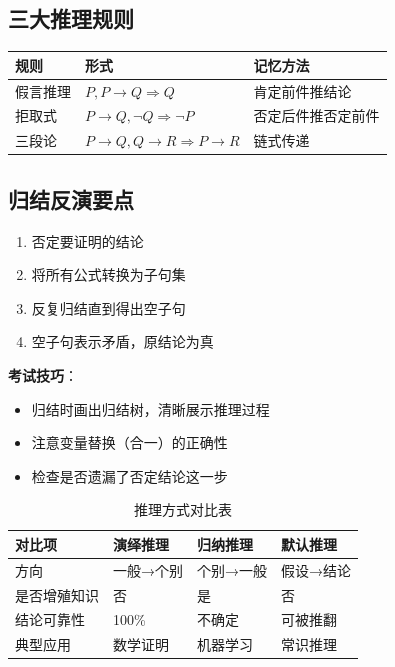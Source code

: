 \subsection{三大推理规则}
\begin{table}[htbp]
\centering\small
\begin{tabular}{lll}
\toprule
\textbf{规则} & \textbf{形式} & \textbf{记忆方法} \\
\midrule
假言推理 & $P, P \to Q \Rightarrow Q$ & 肯定前件推结论 \\
拒取式 & $P \to Q, \neg Q \Rightarrow \neg P$ & 否定后件推否定前件 \\
三段论 & $P \to Q, Q \to R \Rightarrow P \to R$ & 链式传递 \\
\bottomrule
\end{tabular}
\end{table}

\subsection{归结反演要点}
\begin{enumerate}[leftmargin=2em,itemsep=0pt]
    \item 否定要证明的结论
    \item 将所有公式转换为子句集
    \item 反复归结直到得出空子句
    \item 空子句表示矛盾，原结论为真
\end{enumerate}

\begin{tipbox}
\textbf{考试技巧}：
\begin{itemize}[itemsep=0pt]
    \item 归结时画出归结树，清晰展示推理过程
    \item 注意变量替换（合一）的正确性
    \item 检查是否遗漏了否定结论这一步
\end{itemize}
\end{tipbox}

\begin{table}[htbp]
\centering\small
\caption{推理方式对比表}
\begin{tabular}{llll}
\toprule
\textbf{对比项} & \textbf{演绎推理} & \textbf{归纳推理} & \textbf{默认推理} \\
\midrule
方向 & 一般→个别 & 个别→一般 & 假设→结论 \\
是否增殖知识 & 否 & 是 & 否 \\
结论可靠性 & 100\% & 不确定 & 可被推翻 \\
典型应用 & 数学证明 & 机器学习 & 常识推理 \\
\bottomrule
\end{tabular}
\end{table}
